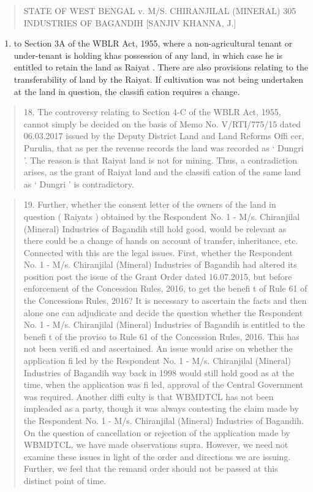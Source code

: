 \documentclass[12pt,a4paper]{article}
\newenvironment{judgequote}
  {\begin{quote}\small}
  {\end{quote}}
\begin{document}

\begin{judgequote}
STATE OF WEST BENGAL v. M/S. CHIRANJILAL (MINERAL) 305
INDUSTRIES OF BAGANDIH [SANJIV KHANNA, J.]
\end{judgequote}

\begin{enumerate}[resume]
\item to Section 3A of the WBLR Act, 1955, where a non-agricultural tenant
or under-tenant is holding khas possession of any land, in which case he is
entitled to retain the land as Raiyat . There are also provisions relating to the
transferability of land by the Raiyat. If cultivation was not being undertaken
at the land in question, the classifi cation requires a change.
\end{enumerate}

\begin{judgequote}
18. The controversy relating to Section 4-C of the WBLR Act, 1955,
cannot simply be decided on the basis of Memo No. V/RTI/775/15 dated
06.03.2017 issued by the Deputy District Land and Land Reforms Offi cer,
Purulia, that as per the revenue records the land was recorded as ` Dungri '.
The reason is that Raiyat land is not for mining. Thus, a contradiction
arises, as the grant of Raiyat land and the classifi cation of the same land as
` Dungri ' is contradictory.
\end{judgequote}

\begin{judgequote}
19. Further, whether the consent letter of the owners of the land in
question ( Raiyats ) obtained by the Respondent No. 1 - M/s. Chiranjilal
(Mineral) Industries of Bagandih still hold good, would be relevant as there
could be a change of hands on account of transfer, inheritance, etc. Connected
with this are the legal issues. First, whether the Respondent No. 1 - M/s.
Chiranjilal (Mineral) Industries of Bagandih had altered its position post the
issue of the Grant Order dated 16.07.2015, but before enforcement of the
Concession Rules, 2016, to get the benefi t of Rule 61 of the Concessions
Rules, 2016? It is necessary to ascertain the facts and then alone one can
adjudicate and decide the question whether the Respondent No. 1 - M/s.
Chiranjilal (Mineral) Industries of Bagandih is entitled to the benefi t of
the proviso to Rule 61 of the Concession Rules, 2016. This has not been
verifi ed and ascertained. An issue would arise on whether the application
fi led by the Respondent No. 1 - M/s. Chiranjilal (Mineral) Industries of
Bagandih way back in 1998 would still hold good as at the time, when the
application was fi led, approval of the Central Government was required.
Another diffi culty is that WBMDTCL has not been impleaded as a party,
though it was always contesting the claim made by the Respondent No.
1 - M/s. Chiranjilal (Mineral) Industries of Bagandih. On the question of
cancellation or rejection of the application made by WBMDTCL, we have
made observations supra. However, we need not examine these issues in
light of the order and directions we are issuing. Further, we feel that the
remand order should not be passed at this distinct point of time.
\end{judgequote}
\end{document}
